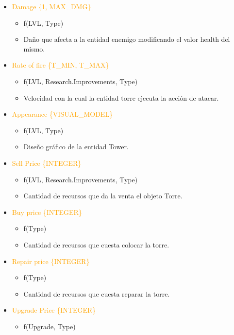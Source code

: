\documentclass{article}
\begin{document}
\begin{itemize}
    \item \textcolor{Orange}{Damage \{1, MAX\_DMG\}}
    \begin{itemize}
        \item f(LVL, Type)
        \item Daño que afecta a la entidad enemigo modificando el valor health del mismo.
    \end{itemize}
    \item \textcolor{Orange}{Rate of fire \{T\_MIN, T\_MAX\}}
    \begin{itemize}
        \item f(LVL, Research.Improvements, Type)
        \item Velocidad con la cual la entidad torre ejecuta la acción de atacar.
    \end{itemize}
    \item \textcolor{Orange}{Appearance \{VISUAL\_MODEL\}}
    \begin{itemize}
        \item f(LVL, Type)
        \item Diseño gráfico de la entidad Tower.
    \end{itemize}
    \hfill \break
    \item \textcolor{Orange}{Sell Price \{INTEGER\}}
    \begin{itemize}
        \item f(LVL, Research.Improvements, Type)
        \item Cantidad de recursos que da la venta el objeto Torre.
    \end{itemize}
    \item \textcolor{Orange}{Buy price \{INTEGER\}}
    \begin{itemize}
        \item f(Type)
        \item Cantidad de recursos que cuesta colocar la torre.
    \end{itemize}
    \item \textcolor{Orange}{Repair price \{INTEGER\}}
    \begin{itemize}
        \item f(Type)
        \item Cantidad de recursos que cuesta reparar la torre.
    \end{itemize}
    \item \textcolor{Orange}{Upgrade Price \{INTEGER\}}
    \begin{itemize}
        \item f(Upgrade, Type)

\end{itemize}
\end{itemize}
\end{document}
